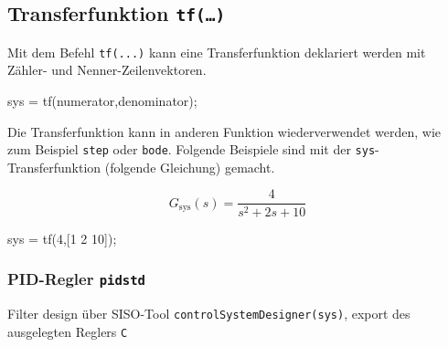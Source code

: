\documentclass[
  10pt,
  a4paper,
  twocolumn]{article}
\newenvironment{Shaded}{}{}
\newcommand{\FloatTok}[1]{\textcolor[rgb]{0.00,0.36,0.77}{#1}}
\newcommand{\NormalTok}[1]{\textcolor[rgb]{0.14,0.16,0.18}{#1}}
\newcommand{\OperatorTok}[1]{\textcolor[rgb]{0.14,0.16,0.18}{#1}}
\newcommand{\VariableTok}[1]{\textcolor[rgb]{0.89,0.38,0.04}{#1}}
\numberwithin{equation}{section}
\begin{document}
\hypertarget{transferfunktion-tf}{%
\subsection{\texorpdfstring{Transferfunktion
\texttt{tf(…)}}{Transferfunktion tf(\ldots)}}\label{transferfunktion-tf}}

Mit dem Befehl \texttt{tf(...)} kann eine Transferfunktion deklariert
werden mit Zähler- und Nenner-Zeilenvektoren.

\begin{Shaded}
\begin{Highlighting}[]
\VariableTok{sys} \OperatorTok{=} \VariableTok{tf}\NormalTok{(}\VariableTok{numerator}\OperatorTok{,}\VariableTok{denominator}\NormalTok{)}\OperatorTok{;}
\end{Highlighting}
\end{Shaded}

Die Transferfunktion kann in anderen Funktion wiederverwendet werden,
wie zum Beispiel \texttt{step} oder \texttt{bode}. Folgende Beispiele
sind mit der \texttt{sys}-Transferfunktion (folgende Gleichung) gemacht.

\[
G_{\text{sys}}(s) = \frac{4}{s^2+2s+10}
\]

\begin{Shaded}
\begin{Highlighting}[]
\VariableTok{sys} \OperatorTok{=} \VariableTok{tf}\NormalTok{(}\FloatTok{4}\OperatorTok{,}\NormalTok{[}\FloatTok{1} \FloatTok{2} \FloatTok{10}\NormalTok{])}\OperatorTok{;}
\end{Highlighting}
\end{Shaded}

\hypertarget{pid-regler-pidstd}{%
\subsubsection{\texorpdfstring{PID-Regler
\texttt{pidstd}}{PID-Regler pidstd}}\label{pid-regler-pidstd}}

Filter design über SISO-Tool \texttt{controlSystemDesigner(sys)}, export
des ausgelegten Reglers \texttt{C}
\end{document}

